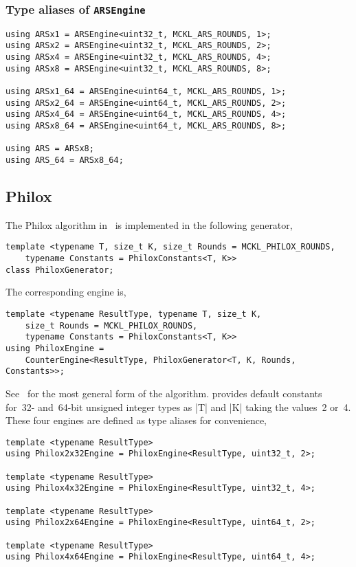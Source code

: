 \subsubsection{Type aliases of \texttt{ARSEngine}}

\begin{verbatim}
using ARSx1 = ARSEngine<uint32_t, MCKL_ARS_ROUNDS, 1>;
using ARSx2 = ARSEngine<uint32_t, MCKL_ARS_ROUNDS, 2>;
using ARSx4 = ARSEngine<uint32_t, MCKL_ARS_ROUNDS, 4>;
using ARSx8 = ARSEngine<uint32_t, MCKL_ARS_ROUNDS, 8>;

using ARSx1_64 = ARSEngine<uint64_t, MCKL_ARS_ROUNDS, 1>;
using ARSx2_64 = ARSEngine<uint64_t, MCKL_ARS_ROUNDS, 2>;
using ARSx4_64 = ARSEngine<uint64_t, MCKL_ARS_ROUNDS, 4>;
using ARSx8_64 = ARSEngine<uint64_t, MCKL_ARS_ROUNDS, 8>;

using ARS = ARSx8;
using ARS_64 = ARSx8_64;
\end{verbatim}

\subsection{Philox}
\label{sub:Philox}

The Philox algorithm in~\cite{Salmon:2011um} is implemented in the following
generator,
\begin{verbatim}
template <typename T, size_t K, size_t Rounds = MCKL_PHILOX_ROUNDS,
    typename Constants = PhiloxConstants<T, K>>
class PhiloxGenerator;
\end{verbatim}
The corresponding \rng engine is,
\begin{verbatim}
template <typename ResultType, typename T, size_t K,
    size_t Rounds = MCKL_PHILOX_ROUNDS,
    typename Constants = PhiloxConstants<T, K>>
using PhiloxEngine =
    CounterEngine<ResultType, PhiloxGenerator<T, K, Rounds, Constants>>;
\end{verbatim}
See~\cite{Salmon:2011um} for the most general form of the algorithm. \mckl
provides default constants for~32- and~64-bit unsigned integer types as |T| and
|K| taking the values~2 or~4. These four engines are defined as type aliases
for convenience,
\begin{verbatim}
template <typename ResultType>
using Philox2x32Engine = PhiloxEngine<ResultType, uint32_t, 2>;

template <typename ResultType>
using Philox4x32Engine = PhiloxEngine<ResultType, uint32_t, 4>;

template <typename ResultType>
using Philox2x64Engine = PhiloxEngine<ResultType, uint64_t, 2>;

template <typename ResultType>
using Philox4x64Engine = PhiloxEngine<ResultType, uint64_t, 4>;
\end{verbatim}

